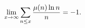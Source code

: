 \[\lim_{x\to\infty}\sum_{n\leq x}\frac{\mathop{\mu\/}\nolimits\!\left(n\right)%
\mathop{\ln\/}\nolimits n}{n}=-1.\]